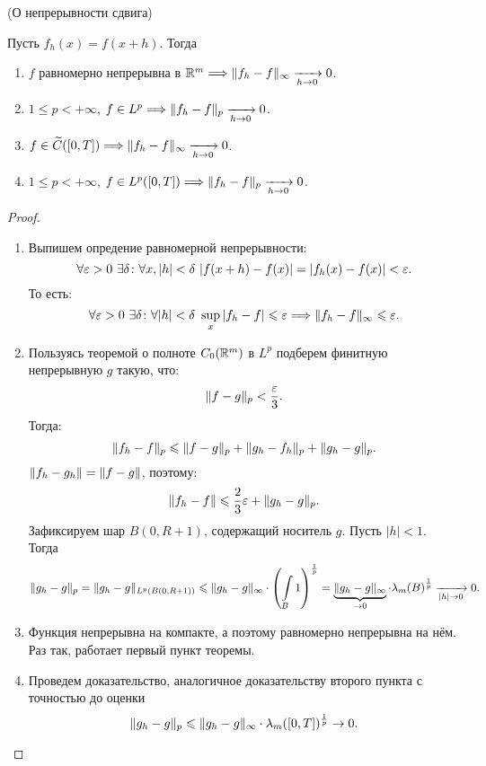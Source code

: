 \begin{theorem}(О непрерывности сдвига)
    
    Пусть $f_h(x) = f(x + h)$. Тогда
    \begin{enumerate}
        \item $f$ равномерно непрерывна в $\Rm \Lra \norm{f_h - f}_{\infty}
            \xrightarrow[h \to 0]{} 0$.
        \item $1 \leqslant p < +\infty$, $f \in L^p \Lra \norm{f_h - f}_p 
            \xrightarrow[h \to 0]{} 0$.
        \item $f \in \widetilde{C}([0, T]) \Lra \norm{f_h - f}_{\infty} 
            \xrightarrow[h \to 0]{} 0$.
        \item $1 \leqslant p < +\infty$, $f \in L^p([0, T]) \Lra \norm{f_h - f}_
            {p} \xrightarrow[h \to 0]{} 0$.
    \end{enumerate} 
\end{theorem}
\begin{proof}
    \enewline
    \begin{enumerate}
        \item Выпишем опредение равномерной непрерывности:
            \[
                \forall \e > 0~\exists \delta\colon \forall x, |h| < \delta~
                |f(x + h) - f(x)| = |f_h(x) - f(x)| < \e
            .\]
            То есть:
            \[
                \forall \e > 0~\exists \delta\colon \forall |h| < \delta~
                \sup_x{|f_h - f|} \leqslant \e \Lra \norm{f_h - f}_\infty 
                \leqslant \e
            .\]
        \item Пользуясь теоремой о полноте $C_0(\Rm)$ в $L^p$ подберем
            финитную непрерывную $g$ такую, что:
            \[
                \norm{f - g}_p < \frac{\e}{3} 
            .\]
            Тогда:
            \[
                \norm{f_h - f}_p \leqslant \norm{f - g}_p + \norm{g_h - f_h}_p
                + \norm{g_h - g}_p
            .\]
            $\norm{f_h - g_h} = \norm{f - g}$, поэтому:
            \[
                \norm{f_h - f} \leqslant \frac{2}{3} \e + \norm{g_h - g}_p
            .\]
            Зафиксируем шар $B(0, R + 1)$, содержащий носитель $g$. Пусть
            $|h| < 1$. Тогда
            \[
                \norm{g_h - g}_p = \norm{g_h - g}_{L^p(B(0, R + 1))} \leqslant
                \norm{g_h - g}_\infty \cdot \parens*{\intl_B{1}}^{\frac{1}{p}} =
                \underbrace{\norm{g_h - g}_\infty}_{\to 0} \cdot 
                {\lambda_m(B)}^{\frac{1}{p}} \xrightarrow[|h| \to 0]{} 0
            .\]
        \item Функция непрерывна на компакте, а поэтому равномерно непрерывна на
            нём. Раз так, работает первый пункт теоремы.
        \item Проведем доказательство, аналогичное доказательству второго пункта
            с точностью до оценки
            \[
                \norm{g_h - g}_p \leqslant \norm{g_h - g}_\infty \cdot 
                \lambda_m([0, T])^{\frac{1}{p}} \to 0
            .\]
    \end{enumerate}
\end{proof}

